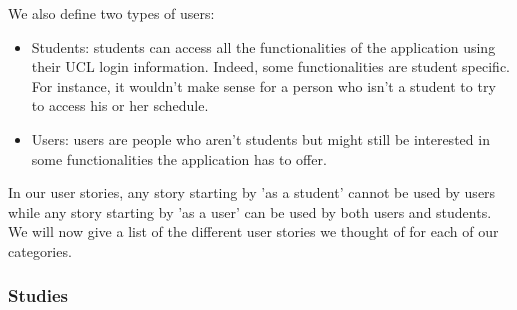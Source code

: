 \documentclass[11pt, a4paper]{report}
\begin{document}
We also define two types of users:

\begin{itemize}

\item Students: students can access all the functionalities of the application using their UCL login information. Indeed, some functionalities are student specific. For instance, it wouldn't make sense for a person who isn't a student to try to access his or her schedule.

\item Users: users are people who aren't students but might still be interested in some functionalities the application has to offer. 

\end{itemize}

In our user stories, any story starting by 'as a student' cannot be used by users while any story starting by 'as a user' can be used by both users and students.\\

We will now give a list of the different user stories we thought of for each of our categories.

\subsubsection{Studies}
\end{document}
